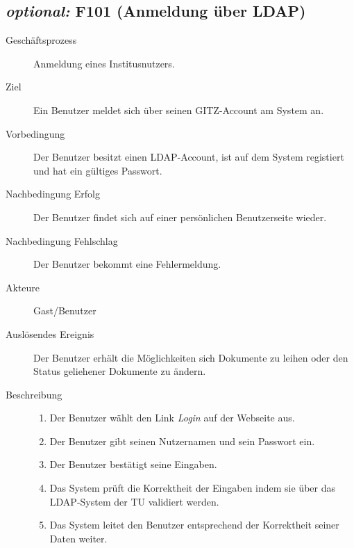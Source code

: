 \subsection{\emph{optional:} F101 (Anmeldung über LDAP)}
\label{F:AnmeldungAFS}
\begin{description}
  \item[Geschäftsprozess]Anmeldung eines Institusnutzers.
  \item[Ziel]Ein Benutzer meldet sich über seinen \gls{GITZ}-Account am System an.
  \item[Vorbedingung]Der Benutzer besitzt einen \gls{LDAP}-Account, ist auf dem System registiert und hat ein gültiges Passwort.
  \item[Nachbedingung Erfolg]Der Benutzer findet sich auf einer persönlichen Benutzerseite wieder.
  \item[Nachbedingung Fehlschlag]Der Benutzer bekommt eine Fehlermeldung.
  \item[Akteure]Gast/Benutzer
  \item[Auslösendes Ereignis]Der Benutzer erhält die Möglichkeiten sich Dokumente zu leihen oder den Status geliehener Dokumente zu ändern.
  \item[Beschreibung]\hfill
    \begin{enumerate}
      \item Der Benutzer wählt den Link \emph{Login} auf der Webseite aus.
      \item Der Benutzer gibt seinen Nutzernamen und sein Passwort ein.
      \item Der Benutzer bestätigt seine Eingaben.
      \item Das System prüft die Korrektheit der Eingaben indem sie über das \gls{LDAP}-System der TU validiert werden.
      \item Das System leitet den Benutzer entsprechend der Korrektheit seiner Daten weiter.
    \end{enumerate}
\end{description}

